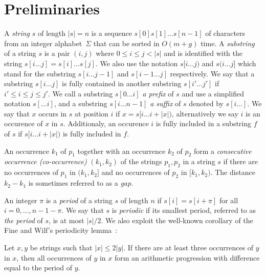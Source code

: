  
\section{Preliminaries}
\label{pmgapped:sec:prelim}
A \emph{string} $s$ of length $|s| = n$ is a sequence $s[0]s[1]\dots s[n-1]$ of characters from an integer alphabet~$\Sigma$ that can be sorted in $O(m+g)$ time.
A \emph{substring} of a string $s$ is a pair $(i,j)$ where  $0 \le i \le j < |s|$ and is identified with the string $s[i \dots j]=s[i] \dots s[j]$. We also use the notation $s[i \dots j)$ and $s(i \dots j]$ which stand for the substring $s[i \dots j-1]$ and $s[i-1 \dots j]$ respectively.
We say that a substring $s[i \dots j]$ is fully contained in another substring $s[i' \dots j']$ if $i' \le i \le j \le j'$. 
We call a substring $s[0 \dots i]$ \emph{a prefix} of $s$ and use a simplified notation $s[\dots i]$, and a substring $s[i \dots n-1]$ \emph{a suffix} of $s$ denoted by $s[i \dots]$. 
We say that $x$ occurs in $s$ at position $i$ if $x = s[i \dots i+|x|)$, alternatively we say $i$ is an occurence of $x$ in $s$.
Additionaly, an occurence $i$ is fully included in a substring $f$ of $s$ if $s[i \dots i+|x|)$ is fully included in $f$.
%

An occurrence $k_1$ of $p_1$ together with an occurrence $k_2$ of $p_2$ form a \emph{consecutive occurrence (co-occurrence)} $(k_1,k_2)$ of the strings $p_1,p_2$ in a string $s$ if there are no occurrences of $p_1$ in $(k_1,k_2]$ and no occurrences of $p_2$ in $[k_1,k_2)$. The distance $k_2-k_1$ is sometimes referred to as a \emph{gap}.

An integer $\pi$ is a \emph{period} of a string $s$ of length $n$ if $s[i]=s[i+\pi]$ for all $i=0,\dots, n-1-\pi$. We say that $s$ is \emph{periodic} if its smallest period, referred to as \emph{the period} of $s$, is at most $|s|/2$. We also exploit the well-known corollary of the Fine and Wilf's periodicity lemma~\cite{Fine1965}:


\begin{corollary}\label{pmgapped:cor:arithmetic_progression}
Let $x, y$ be strings such that $|x|\leq 2|y|$. If there are at least three occurrences of $y$ in $x$, then all occurrences of $y$ in $x$ form an arithmetic progression with difference equal to the period of $y$. 
\end{corollary}


